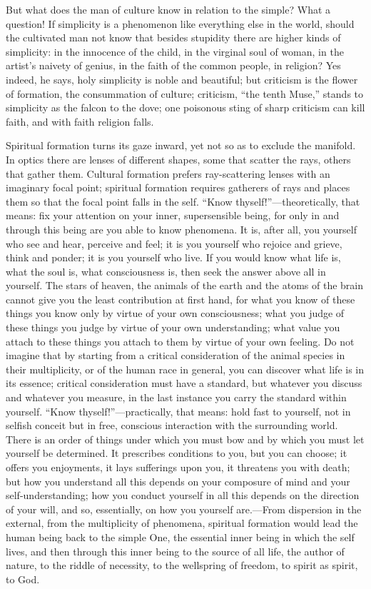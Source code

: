 \documentclass[12pt,a4paper,openany]{book}
\newcommand{\opage}[1]{\marginnote{\footnotesize\textit{[#1]}}}
\begin{document}
But what does the man of culture know in relation to the simple? What a
question! If simplicity is a phenomenon like everything else in the
world, should the cultivated man not know that besides stupidity there
are higher kinds of simplicity: in the innocence of the child, in the
virginal soul of woman, in the artist's naivety of genius, in the faith
of the common people, in religion? Yes indeed, he says, holy simplicity
is noble and beautiful; but criticism is the flower of formation, the
consummation of culture; criticism, ``the tenth Muse,'' stands to
simplicity as the falcon to the dove; one poisonous sting of sharp
criticism can kill faith, and with faith religion falls.

Spiritual formation turns its gaze inward, yet not so as to exclude the
manifold. In optics there are lenses of different shapes, some that
\opage{4}scatter the rays, others that gather them. Cultural formation prefers
ray-scattering lenses with an imaginary focal point; spiritual formation
requires gatherers of rays and places them so that the focal point falls
in the self. ``Know thyself!''---theoretically, that means: fix your
attention on your inner, supersensible being, for only in and through
this being are you able to know phenomena. It is, after all, you yourself
who see and hear, perceive and feel; it is you yourself who rejoice and
grieve, think and ponder; it is you yourself who live. If you would know
what life is, what the soul is, what consciousness is, then seek the
answer above all in yourself. The stars of heaven, the animals of the
earth and the atoms of the brain cannot give you the least contribution
at first hand, for what you know of these things you know only by virtue
of your own consciousness; what you judge of these things you judge by
virtue of your own understanding; what value you attach to these things
you attach to them by virtue of your own feeling. Do not imagine that by
starting from a critical consideration of the animal species in their
multiplicity, or of the human race in general, you can discover what life
is in its essence; critical consideration must have a standard, but
whatever you discuss and whatever you measure, in the last instance you
carry the standard within yourself. ``Know thyself!''---practically, that
means: hold fast to yourself, not in selfish conceit but in free,
conscious interaction with the surrounding world. There is an order of
things under which you must bow and by which you must let yourself be
determined. It prescribes conditions to you, but you can choose; it
offers you enjoyments, it lays sufferings upon you, it threatens you with
death; but \opage{5}how you understand all this depends on your composure of mind
and your self-understanding; how you conduct yourself in all this depends
on the direction of your will, and so, essentially, on how you yourself
are.---From dispersion in the external, from the multiplicity of
phenomena, spiritual formation would lead the human being back to the
simple One, the essential inner being in which the self lives, and then
through this inner being to the source of all life, the author of nature,
to the riddle of necessity, to the wellspring of freedom, to spirit as
spirit, to God.
\end{document}
